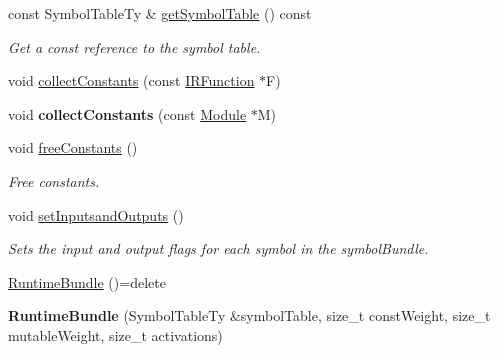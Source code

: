 \begin{DoxyCompactItemize}
const Symbol\+Table\+Ty \& \hyperlink{classglow_1_1runtime_1_1_runtime_bundle_a29fce3fb1bbb1bf761366d6e03c24dc9}{get\+Symbol\+Table} () const
\begin{DoxyCompactList}\small\item\em Get a const reference to the symbol table. \end{DoxyCompactList}\item 
void \hyperlink{classglow_1_1runtime_1_1_runtime_bundle_ab01a849dbfc29a86c392e213a8dd8b2b}{collect\+Constants} (const \hyperlink{classglow_1_1_i_r_function}{I\+R\+Function} $\ast$F)
\item 
\mbox{\label{classglow_1_1runtime_1_1_runtime_bundle_aedcd7f06fa34bcd10897da2385387afd}} 
void {\bfseries collect\+Constants} (const \hyperlink{classglow_1_1_module}{Module} $\ast$M)
\item 
\mbox{\label{classglow_1_1runtime_1_1_runtime_bundle_a4f72dac6c7bac5e95b32a212d0341c0f}} 
void \hyperlink{classglow_1_1runtime_1_1_runtime_bundle_a4f72dac6c7bac5e95b32a212d0341c0f}{free\+Constants} ()
\begin{DoxyCompactList}\small\item\em Free constants. \end{DoxyCompactList}\item 
\mbox{\label{classglow_1_1runtime_1_1_runtime_bundle_ae5541e5c198da1a287eb280664714b8f}} 
void \hyperlink{classglow_1_1runtime_1_1_runtime_bundle_ae5541e5c198da1a287eb280664714b8f}{set\+Inputsand\+Outputs} ()
\begin{DoxyCompactList}\small\item\em Sets the input and output flags for each symbol in the symbol\+Bundle. \end{DoxyCompactList}\item 
\hyperlink{classglow_1_1runtime_1_1_runtime_bundle_aa5e7328e332d3c678247ee266fba343f}{Runtime\+Bundle} ()=delete
\item 
\mbox{\label{classglow_1_1runtime_1_1_runtime_bundle_addc01cff043fa9667a9424ca84e5e96c}} 
{\bfseries Runtime\+Bundle} (Symbol\+Table\+Ty \&symbol\+Table, size\+\_\+t const\+Weight, size\+\_\+t mutable\+Weight, size\+\_\+t activations)
\item 

\end{DoxyCompactItemize}
